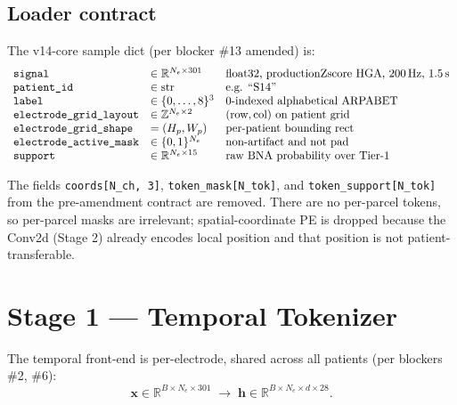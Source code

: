 \documentclass[11pt,letterpaper]{article}
\newcommand{\R}{\mathbb{R}}
\newcommand{\bx}{\mathbf{x}}
\newcommand{\bh}{\mathbf{h}}
\begin{document}
\subsection{Loader contract}

The v14-core sample dict (per blocker \#13 amended) is:
\begin{equation*}
\begin{array}{lll}
\texttt{signal}                  & \in \R^{N_e \times 301}      & \text{float32, productionZscore HGA, 200\,Hz, 1.5\,s} \\
\texttt{patient\_id}             & \in \text{str}               & \text{e.g. ``S14''} \\
\texttt{label}                   & \in \{0,\ldots,8\}^{3}        & \text{0-indexed alphabetical ARPABET} \\
\texttt{electrode\_grid\_layout} & \in \mathbb{Z}^{N_e \times 2} & (\text{row}, \text{col}) \text{ on patient grid} \\
\texttt{electrode\_grid\_shape}  & = (H_p, W_p)                  & \text{per-patient bounding rect} \\
\texttt{electrode\_active\_mask} & \in \{0,1\}^{N_e}             & \text{non-artifact and not pad} \\
\texttt{support}                 & \in \R^{N_e \times 15}        & \text{raw BNA probability over Tier-1}
\end{array}
\end{equation*}

The fields \texttt{coords[N\_ch, 3]}, \texttt{token\_mask[N\_tok]}, and \texttt{token\_support[N\_tok]} from the pre-amendment contract are removed. There are no per-parcel tokens, so per-parcel masks are irrelevant; spatial-coordinate PE is dropped because the Conv2d (Stage 2) already encodes local position and that position is not patient-transferable.


\section{Stage 1 --- Temporal Tokenizer}

The temporal front-end is per-electrode, shared across all patients (per blockers \#2, \#6):
\begin{equation}
\bx \in \R^{B \times N_e \times 301}
\;\rightarrow\;
\bh \in \R^{B \times N_e \times d \times 28}.
\end{equation}
\end{document}

